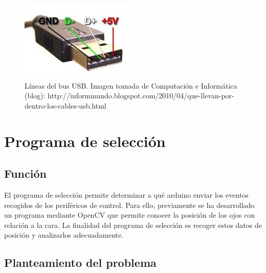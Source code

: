 \begin{figure}[H]
\centering
\includegraphics[scale = 0.65]{capitulo_02/figuras_dir/USB.jpg}
\caption{Líneas del bus USB. Imagen tomada de Computación e Informática (blog): http://informmundo.blogspot.com/2010/04/que-llevan-por-dentro-los-cables-usb.html}
\label{fig: USB}
\end{figure}




















\section{Programa de selección} \label{s2_4}

\subsection{Función} \label{s2_4_1}

El programa de selección permite determinar a qué arduino enviar los eventos recogidos de los periféricos de control. Para ello, previamente se ha desarrollado un programa mediante OpenCV que permite conocer la posición de los ojos con relación a la cara. La finalidad del programa de selección es recoger estos datos de posición y analizarlos adecuadamente.

\subsection{Planteamiento del problema} \label{s2_4_2}


